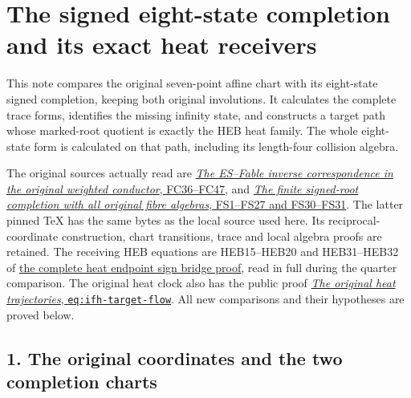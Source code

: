 \documentclass[
  10pt,
  a4paper,
]{article}
\author{}
\date{}
\begin{document}
{
\setcounter{tocdepth}{3}
\tableofcontents
}
\section{The signed eight-state completion and its exact heat
receivers}\label{the-signed-eight-state-completion-and-its-exact-heat-receivers}

This note compares the original seven-point affine chart with its
eight-state signed completion, keeping both original involutions. It
calculates the complete trace forms, identifies the missing infinity
state, and constructs a target path whose marked-root quotient is
exactly the HEB heat family. The whole eight-state form is calculated on
that path, including its length-four collision algebra.

The original sources actually read are
\href{https://github.com/KokunoYumeto/zeta-function-research-reader/blob/ab45e221579a0d48ce2885b4ecdf1a6aefc24a20/workbenches/splitzero-tandem/continuations/20260920-fable-boundary-action/FABLE_TO_ORIGINAL_CONDUCTOR.tex}{\emph{The
ES--Fable inverse correspondence in the original weighted conductor},
FC36--FC47}, and
\href{https://github.com/KokunoYumeto/zeta-function-research-reader/blob/0fd693c844aad9117e30ec447c59864a28af10f3/workbenches/splitzero-tandem/continuations/20260921-native-spectral-real-pair/005/independent/FINITE_SIGNED_COMPLETION.tex}{\emph{The
finite signed-root completion with all original fibre algebras},
FS1--FS27 and FS30--FS31}. The latter pinned TeX has the same bytes as
the local source used here. Its reciprocal-coordinate construction,
chart transitions, trace and local algebra proofs are retained. The
receiving HEB equations are HEB15--HEB20 and HEB31--HEB32 of
\href{https://github.com/KokunoYumeto/zeta-function-research-reader/blob/d5c9d198a8432e3ede468b280162a99c00e3f4f7/workbenches/splitzero-tandem/branches/tau-zero-prime-positivity/HEAT_ENDPOINT_SIGN_BRIDGE.md}{the
complete heat endpoint sign bridge proof}, read in full during the
quarter comparison. The original heat clock also has the public proof
\href{https://github.com/KokunoYumeto/zeta-function-research-reader/blob/ac168d55cbb400a6c8926a00d67909ba65646ac5/satellites/26_incompressible_fibre_heat.tex\#L389}{\emph{The
original heat trajectories}, \texttt{eq:\allowbreak{}ifh-\allowbreak{}target-\allowbreak{}flow}}. All new
comparisons and their hypotheses are proved below.

\subsection{1. The original coordinates and the two completion
charts}\label{the-original-coordinates-and-the-two-completion-charts}
\end{document}
